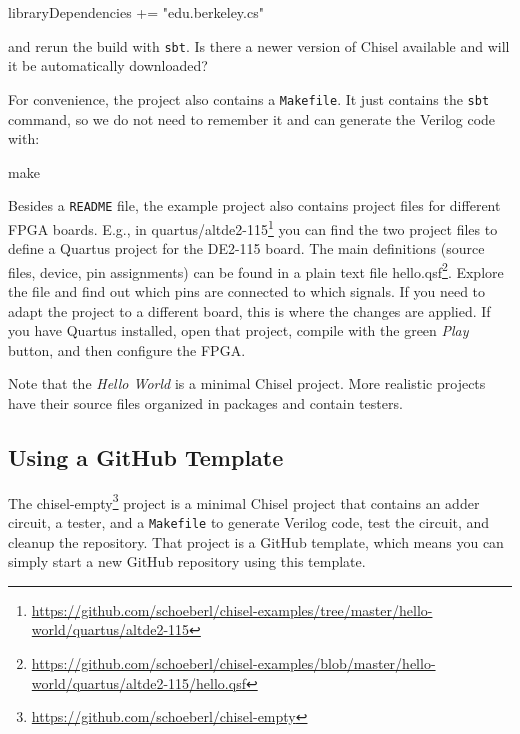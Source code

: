 \documentclass[%
    10pt,
    headinclude, footexclude,
    openright, %
    notitlepage,
    cleardoubleempty,
    headsepline,
    pointlessnumbers,
    bibtotoc, idxtotoc,
    ]{scrbook}
\newcommand{\code}[1]{{\lstinline[basicstyle=\small\ttfamily]{#1}}}
\newcommand{\myref}[2]{\href{#1}{#2}}
\renewcommand{\myref}[2]{{#2}{\footnote{\url{#1}}}}
\begin{document}
\begin{chisel}
libraryDependencies += "edu.berkeley.cs" %
\end{chisel}

\noindent and rerun the build with \code{sbt}. Is there a newer version of Chisel
available and will it be automatically downloaded?

For convenience, the project also contains a \code{Makefile}.
It just contains the \code{sbt} command, so we do not need to remember it and
can generate the Verilog code with:

\begin{chisel}
make
\end{chisel}

Besides a \code{README} file, the example project also contains project
files for different FPGA boards. E.g., in
\myref{https://github.com/schoeberl/chisel-examples/tree/master/hello-world/quartus/altde2-115}{quartus/altde2-115}
you can find the two project files to define a Quartus project for the DE2-115 board.
The main definitions (source files, device, pin assignments) can be found in a plain text file
\myref{https://github.com/schoeberl/chisel-examples/blob/master/hello-world/quartus/altde2-115/hello.qsf}{hello.qsf}.
Explore the file and find out which pins are connected to which signals.
If you need to adapt the project to a different board, this is where the changes are applied.
If you have Quartus installed, open that project, compile with the green \emph{Play} button,
and then configure the FPGA.

Note that the \emph{Hello World} is a minimal Chisel project.
More realistic projects have their source files organized in packages and contain testers.

\subsection{Using a GitHub Template}

The \myref{https://github.com/schoeberl/chisel-empty}{chisel-empty} project is a minimal Chisel
project that contains an adder circuit, a tester, and a \code{Makefile} to generate
Verilog code, test the circuit, and cleanup the repository.
That project is a GitHub template, which means you can simply start a new GitHub repository
using this template.
\end{document}
